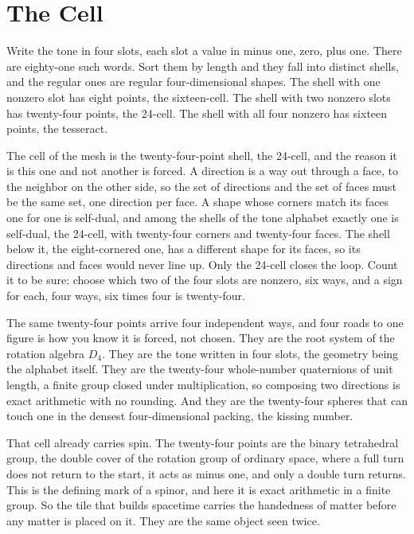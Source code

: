 \section{The Cell}

Write the tone in four slots, each slot a value in minus one, zero, plus one. There are eighty-one such words. Sort them by length and they fall into distinct shells, and the regular ones are regular four-dimensional shapes. The shell with one nonzero slot has eight points, the sixteen-cell. The shell with two nonzero slots has twenty-four points, the 24-cell. The shell with all four nonzero has sixteen points, the tesseract.

The cell of the mesh is the twenty-four-point shell, the 24-cell, and the reason it is this one and not another is forced. A direction is a way out through a face, to the neighbor on the other side, so the set of directions and the set of faces must be the same set, one direction per face. A shape whose corners match its faces one for one is self-dual, and among the shells of the tone alphabet exactly one is self-dual, the 24-cell, with twenty-four corners and twenty-four faces. The shell below it, the eight-cornered one, has a different shape for its faces, so its directions and faces would never line up. Only the 24-cell closes the loop. Count it to be sure: choose which two of the four slots are nonzero, six ways, and a sign for each, four ways, six times four is twenty-four.

The same twenty-four points arrive four independent ways, and four roads to one figure is how you know it is forced, not chosen. They are the root system of the rotation algebra $D_4$. They are the tone written in four slots, the geometry being the alphabet itself. They are the twenty-four whole-number quaternions of unit length, a finite group closed under multiplication, so composing two directions is exact arithmetic with no rounding. And they are the twenty-four spheres that can touch one in the densest four-dimensional packing, the kissing number.

That cell already carries spin. The twenty-four points are the binary tetrahedral group, the double cover of the rotation group of ordinary space, where a full turn does not return to the start, it acts as minus one, and only a double turn returns. This is the defining mark of a spinor, and here it is exact arithmetic in a finite group. So the tile that builds spacetime carries the handedness of matter before any matter is placed on it. They are the same object seen twice.
